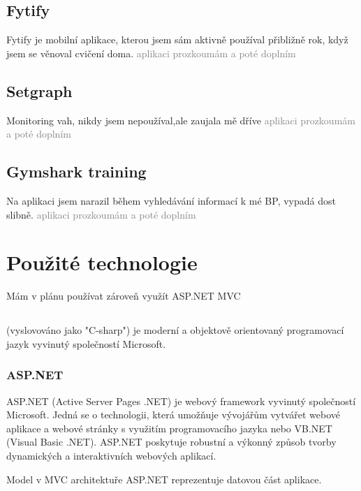 \documentclass[
  field=inf,
  biblatex,
  glossaries,
  index
]{kidiplom}
\begin{document}
\subsection{Fytify}
Fytify je mobilní aplikace, kterou jsem sám aktivně používal přibližně rok, když jsem se věnoval cvičení doma.
\noindent\textcolor{gray}{aplikaci prozkoumám a poté doplním}

\subsection{Setgraph}
Monitoring vah, nikdy jsem nepoužíval,ale zaujala mě dříve
\noindent\textcolor{gray}{aplikaci prozkoumám a poté doplním}

\subsection{Gymshark training}
Na aplikaci jsem narazil během vyhledávání informací k mé BP, vypadá dost slibně.
\noindent\textcolor{gray}{aplikaci prozkoumám a poté doplním}

\section{Použité technologie}
Mám v plánu používat \csharp  zároveň využít ASP.NET MVC

\subsection{\csharp}

\csharp \hspace{1mm} (vyslovováno jako "C-sharp") je moderní a objektově orientovaný programovací jazyk vyvinutý společností Microsoft. 

\subsubsection{ASP.NET}

ASP.NET (Active Server Pages .NET) je webový framework vyvinutý společností Microsoft. Jedná se o technologii, která umožňuje vývojářům vytvářet webové aplikace a webové stránky s využitím programovacího jazyka \csharp \hspace{1mm} nebo VB.NET (Visual Basic .NET). ASP.NET poskytuje robustní a výkonný způsob tvorby dynamických a interaktivních webových aplikací.


Model v MVC architektuře ASP.NET reprezentuje datovou část aplikace. 
\end{document}
